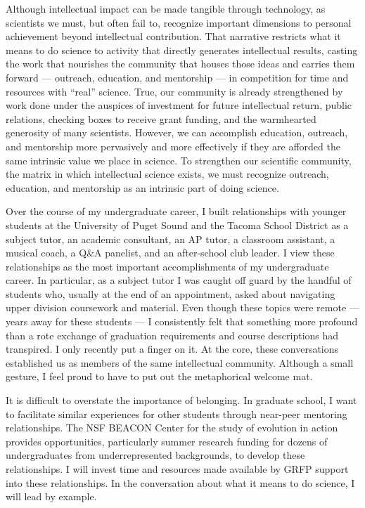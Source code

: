 Although intellectual impact can be made tangible through technology, as scientists we must, but often fail to, recognize important dimensions to personal achievement beyond intellectual contribution.
That narrative restricts what it means to do science to activity that directly generates intellectual results, casting the work that nourishes the community that houses those ideas and carries them forward --- outreach, education, and mentorship --- in competition for time and resources with ``real'' science.
True, our community is already strengthened by work done under the auspices of investment for future intellectual return, public relations, checking boxes to receive grant funding, and the warmhearted generosity of many scientists.
However, we can accomplish education, outreach, and mentorship more pervasively and more effectively if they are afforded the same intrinsic value we place in science.
To strengthen our scientific community, the matrix in which intellectual science exists, we must recognize outreach, education, and mentorship as an intrinsic part of doing science.

Over the course of my undergraduate career, I built relationships with younger students at the University of Puget Sound and the Tacoma School District as a subject tutor, an academic consultant, an AP tutor, a classroom assistant, a musical coach, a Q\&A panelist, and an after-school club leader.
I view these relationships as the most important accomplishments of my undergraduate career.
In particular, as a subject tutor I was caught off guard by the handful of students who, usually at the end of an appointment, asked about navigating upper division coursework and material.
Even though these topics were remote --- years away for these students --- I consistently felt that something more profound than a rote exchange of graduation requirements and course descriptions had transpired.
I only recently put a finger on it.
At the core, these conversations established us as members of the same intellectual community.
Although a small gesture, I feel proud to have to put out the metaphorical   welcome mat.

It is difficult to overstate the importance of belonging.
In graduate school, I want to facilitate similar experiences for other students through near-peer mentoring relationships.
The NSF BEACON Center for the study of evolution in action provides opportunities, particularly summer research funding for dozens of undergraduates from underrepresented backgrounds, to develop these relationships.
I will invest time and resources made available by GRFP support into these relationships.
In the conversation about what it means to do science, I will lead by example.

